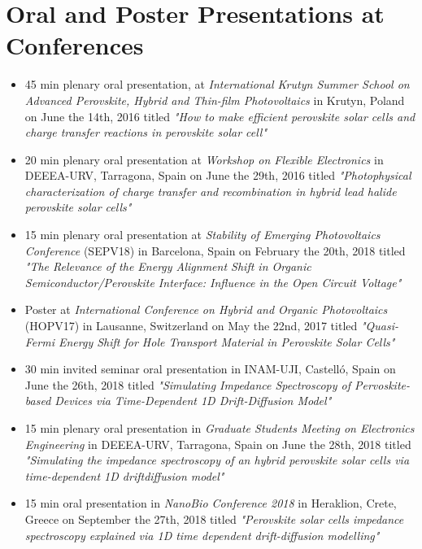 \documentclass[b5paper, 12pt, openright]{book} %
\begin{document}
{\chapter{Oral and Poster Presentations at Conferences}
\begin{itemize}
	\item 45 min plenary oral presentation, at \textit{International Krutyn Summer School on Advanced Perovskite, Hybrid and Thin-film Photovoltaics} in Krutyn, Poland on June the 14th, 2016 titled \textit{"How to make efficient perovskite solar cells and charge transfer reactions in perovskite solar cell"}
	\item 20 min plenary oral presentation at \textit{Workshop on Flexible Electronics} in DEEEA-URV, Tarragona, Spain on June the 29th, 2016 titled \textit{"Photophysical characterization of charge transfer and recombination in hybrid lead halide perovskite solar cells"}
	\item 15 min plenary oral presentation at \textit{Stability of Emerging Photovoltaics Conference} (SEPV18) in Barcelona, Spain on February the 20th, 2018 titled \textit{"The Relevance of the Energy Alignment Shift in Organic Semiconductor/Perovskite Interface: Influence in the Open Circuit Voltage"}
	\item Poster at \textit{International Conference on Hybrid and Organic Photovoltaics} (HOPV17) in Lausanne, Switzerland on May the 22nd, 2017 titled \textit{"Quasi-Fermi Energy Shift for Hole Transport Material in Perovskite Solar Cells"}
	\item 30 min invited seminar oral presentation in INAM-UJI, Castelló, Spain on June the 26th, 2018 titled \textit{"Simulating Impedance Spectroscopy of Pervoskite-based Devices via Time-Dependent 1D Drift-Diffusion Model"}
	\item 15 min plenary oral presentation in \textit{Graduate Students Meeting on Electronics Engineering} in DEEEA-URV, Tarragona, Spain on June the 28th, 2018 titled \textit{"Simulating the impedance spectroscopy of an hybrid perovskite solar cells via time-dependent 1D driftdiffusion model"}
	\item 15 min oral presentation in \textit{NanoBio Conference 2018} in Heraklion, Crete, Greece on September the 27th, 2018 titled \textit{"Perovskite solar cells impedance spectroscopy explained via 1D time dependent drift-diffusion modelling"}
\end{itemize}


	\EnableQuotes

	}%
\end{document}
